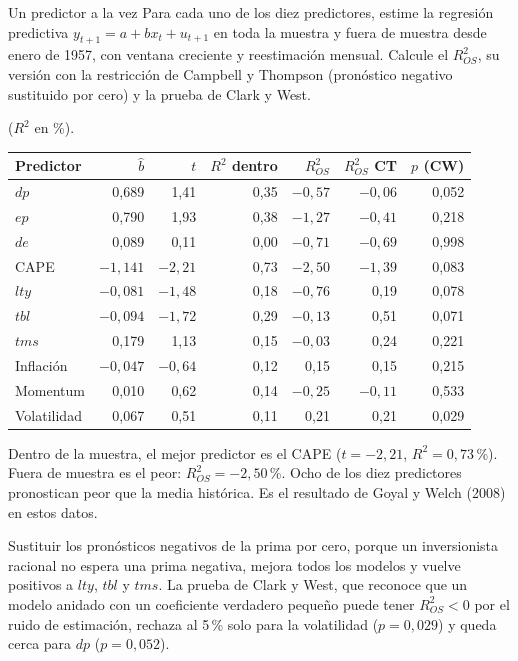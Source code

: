 \begin{ejresuelto}{Un predictor a la vez}\label{ej:goyalwelch}
\enunciado Para cada uno de los diez predictores, estime la regresión predictiva $y_{t+1}=a+bx_t+u_{t+1}$ en toda la muestra y fuera de muestra
desde enero de 1957, con ventana creciente y reestimación mensual. Calcule el $R^2_{OS}$, su versión con la restricción de Campbell y
Thompson (pronóstico negativo sustituido por cero) y la prueba de Clark y West.

\solucion
{} ($R^2$ en \%).
\begin{center}\small
\begin{tabular}{@{}lrrrrrr@{}}
\toprule
Predictor & $\hat b$ & $t$ & $R^2$ dentro & $R^2_{OS}$ & $R^2_{OS}$ CT & $p$ (CW) \\
\midrule
$dp$ & 0,689 & 1,41 & 0,35 & $-0{,}57$ & $-0{,}06$ & 0,052 \\
$ep$ & 0,790 & 1,93 & 0,38 & $-1{,}27$ & $-0{,}41$ & 0,218 \\
$de$ & 0,089 & 0,11 & 0,00 & $-0{,}71$ & $-0{,}69$ & 0,998 \\
CAPE & $-1{,}141$ & $-2{,}21$ & 0,73 & $-2{,}50$ & $-1{,}39$ & 0,083 \\
$lty$ & $-0{,}081$ & $-1{,}48$ & 0,18 & $-0{,}76$ & 0,19 & 0,078 \\
$tbl$ & $-0{,}094$ & $-1{,}72$ & 0,29 & $-0{,}13$ & 0,51 & 0,071 \\
$tms$ & 0,179 & 1,13 & 0,15 & $-0{,}03$ & 0,24 & 0,221 \\
Inflación & $-0{,}047$ & $-0{,}64$ & 0,12 & 0,15 & 0,15 & 0,215 \\
Momentum & 0,010 & 0,62 & 0,14 & $-0{,}25$ & $-0{,}11$ & 0,533 \\
Volatilidad & 0,067 & 0,51 & 0,11 & 0,21 & 0,21 & 0,029 \\
\bottomrule
\end{tabular}
\end{center}
Dentro de la muestra, el mejor predictor es el CAPE ($t=-2{,}21$, $R^2=0{,}73$\,\%). Fuera de muestra es el peor: $R^2_{OS}=-2{,}50$\,\%. Ocho
de los diez predictores pronostican peor que la media histórica. Es el resultado de Goyal y Welch (2008) en estos datos.

 Sustituir los pronósticos negativos de la prima por cero, porque un inversionista racional
no espera una prima negativa, mejora todos los modelos y vuelve positivos a $lty$, $tbl$ y $tms$. La prueba de Clark y West, que
reconoce que un modelo anidado con un coeficiente verdadero pequeño puede tener $R^2_{OS}<0$ por el ruido de estimación, rechaza
al 5\,\% solo para la volatilidad ($p=0{,}029$) y queda cerca para $dp$ ($p=0{,}052$).


\end{ejresuelto}
